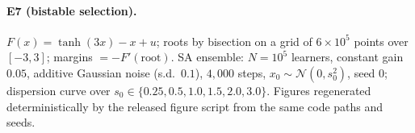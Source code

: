 \documentclass[pmlr]{jmlr}
\begin{document}
\paragraph{E7 (bistable selection).} $F(x) = \tanh(3x) - x + u$; roots by bisection on a grid of
$6 \times 10^5$ points over $[-3, 3]$; margins $= -F'(\text{root})$. SA ensemble:
$N = 10^5$ learners, constant gain $0.05$, additive Gaussian noise (s.d.\ $0.1$), $4{,}000$
steps, $x_0 \sim \mathcal{N}(0, s_0^2)$, seed $0$; dispersion curve over
$s_0 \in \{0.25, 0.5, 1.0, 1.5, 2.0, 3.0\}$. Figures regenerated deterministically by the
released figure script from the same code paths and seeds.
\end{document}
